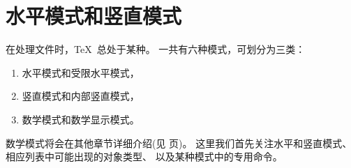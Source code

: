 \documentclass{book}
\begin{document}
\chapter{水平模式和竖直模式}\label{hvmode}
\label{chap:hvmode}

在处理文件时，\TeX\ 总处于某种。
一共有六种模式，可划分为三类：
\begin{enumerate}
\item 水平模式和受限水平模式，
\item 竖直模式和内部竖直模式，
\item 数学模式和数学显示模式。
\end{enumerate}
数学模式将会在其他章节详细介绍(见 \pageref{math:modes} 页)。
这里我们首先关注水平和竖直模式、相应列表中可能出现的对象类型、
以及某种模式中的专用命令。
\end{document}
